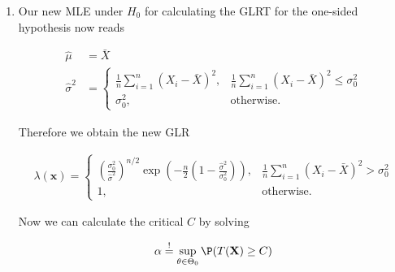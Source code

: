 \begin{solution}
\begin{enumerate}[label = (\alph*)]
        \item Our new MLE under $H_0$ for calculating the GLRT for the one-sided
        hypothesis now reads

        \begin{align*}
            \hat{\mu} &= \bar{X} \\
            \hat{\sigma}^2 &= \begin{cases}
                \frac{1}{n}\sum_{i=1}^n (X_i - \bar{X})^2, & \frac{1}{n}\sum_{i=1}^n (X_i - \bar{X})^2 \leq \sigma_0^2 \\
                \sigma_0^2, & \text{otherwise}.
            \end{cases}
        \end{align*}

        Therefore we obtain the new GLR

        \begin{align*}
            \lambda(\textbf{x}) = \begin{cases}
                \left(\frac{\sigma_0^2}{\hat{\sigma}^2}\right)^{n/2}
            \exp\left(-\frac{n}{2}\left(1 - \frac{\hat{\sigma}^2}{\sigma_0^2}\right)\right), & \frac{1}{n}\sum_{i=1}^n (X_i - \bar{X})^2 > \sigma_0^2 \\
            1, & \text{otherwise}.
            \end{cases}
        \end{align*}

        Now we can calculate the critical $C$ by solving

        \begin{align*}
            \alpha \stackrel{!}{=} \sup_{\theta \in \Theta_0}\P(T(\textbf{X}) \geq C)
        \end{align*}
      \end{enumerate}
    
    \end{solution}
    
    